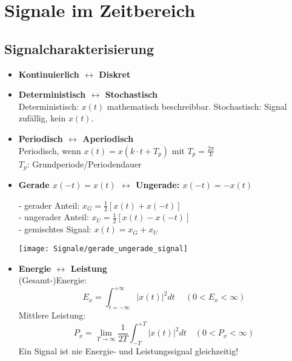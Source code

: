 \section{Signale im Zeitbereich}
  \subsection{Signalcharakterisierung}
  \begin{itemize}
      \item{\textbf{Kontinuierlich \hfill $\longleftrightarrow$ \hfill Diskret}}
      \item{\textbf{Deterministisch \hfill $\longleftrightarrow$ \hfill Stochastisch}}\\
          Deterministisch: $x(t)$ mathematisch beschreibbar.
          Stochastisch: Signal zufällig, kein $x(t)$.
      \item{\textbf{Periodisch \hfill $\longleftrightarrow$ \hfill Aperiodisch}}\\
              Periodisch, wenn $x(t)=x(k \cdot t+T_p)$ mit
			  $T_p = \frac{2\pi}{k}$ \\
              $T_p$: Grundperiode/Periodendauer
      \item{\textbf{Gerade $x(-t)=x(t)$ $\leftrightarrow$ Ungerade: $x(-t)=-x(t)$}}\\
          \begin{mdframed}[style=exercise,frametitle=Zerlegung des Signals:]
              - gerader Anteil: \quad $x_G=\frac{1}{2}\left[x(t)+x(-t)\right]$\\
              - ungerader Anteil: \quad $x_U=\frac{1}{2}\left[ x(t)-x(-t) \right]$\\
              - gemischtes Signal: $x(t)=x_G + x_U$
          \end{mdframed}
          \begin{center}
              \texttt{[image: Signale/gerade\_ungerade\_signal]}
          \end{center}
      \item{\textbf{Energie \hfill $\longleftrightarrow$ \hfill Leistung}}\\
              (Gesamt-)Energie: \[E_x=\int_{t=-\infty}^{+\infty}\lvert x(t)\rvert^2 dt\ \quad (0<E_x<\infty)\]
              Mittlere Leistung: \[P_x=\lim_{T\to\infty}\frac{1}{2T}\int_{-T}^{+T}\lvert x(t)\rvert^2 dt \quad (0<P_x<\infty)\]
                {\small Ein Signal ist nie Energie- und Leistungssignal gleichzeitig!}
          

\end{itemize}
